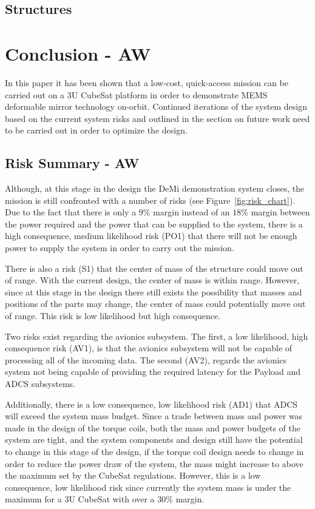 \documentclass[12pt]{article}
\begin{document}

		\subsection{Structures}



\section{Conclusion - AW}

In this paper it has been shown that a low-cost, quick-access mission can be carried out on a 3U CubeSat platform in order to demonstrate MEMS deformable mirror technology on-orbit.  Continued iterations of the system design based on the current system risks and outlined in the section on future work need to be carried out in order to optimize the design.

		\subsection{Risk Summary - AW}

Although, at this stage in the design the DeMi demonstration system closes, the mission is still confronted with a number of risks (see Figure~\ref{fig:risk_chart}).  Due to the fact that there is only a $9\%$ margin instead of an $18\%$ margin between the power required and the power that can be supplied to the system, there is a high consequence, medium likelihood risk (PO1) that there will not be enough power to supply the system in order to carry out the mission.

There is also a risk (S1) that the center of mass of the structure could move out of range.  With the current design, the center of mass is within range.  However, since at this stage in the design there still exists the possibility that masses and positions of the parts may change, the center of mass could potentially move out of range.  This risk is low likelihood but high consequence.

Two risks exist regarding the avionics subsystem.  The first, a low likelihood, high consequence risk (AV1), is that the avionics subsystem will not be capable of processing all of the incoming data.  The second (AV2), regards the avionics system not being capable of providing the required latency for the Payload and ADCS subsystems. 

Additionally, there is a low consequence, low likelihood risk (AD1) that ADCS will exceed the system mass budget.  Since a trade between mass and power was made in the design of the torque coils, both the mass and power budgets of the system are tight, and the system components and design still have the potential to change in this stage of the design, if the torque coil design needs to change in order to reduce the power draw of the system, the mass might increase to above the maximum set by the CubeSat regulations.  However, this is a low consequence, low likelihood risk since currently the system mass is under the maximum for a 3U CubeSat with over a $30\%$ margin.
\end{document}
